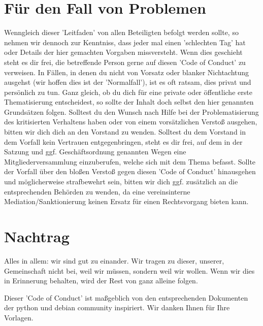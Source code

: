 \documentclass[10pt,a4paper]{article}
\begin{document}
\section*{Für den Fall von Problemen}
Wenngleich dieser 'Leitfaden' von allen Beteiligten befolgt werden sollte, so
nehmen wir dennoch zur Kenntniss, dass jeder mal einen 'schlechten Tag' hat
oder Details der hier gemachten Vorgaben missversteht. Wenn dies geschieht
steht es dir frei, die betreffende Person gerne auf diesen 'Code of Conduct' zu verweisen. In
Fällen, in denen du nicht von Vorsatz oder blanker Nichtachtung ausgehst (wir
hoffen dies ist der 'Normalfall'), ist es oft ratsam, dies privat und persönlich
zu tun. Ganz gleich, ob du dich für eine private oder öffentliche erste
Thematisierung entscheidest, so sollte der Inhalt doch selbst den hier
genannten Grundsätzen folgen.
Solltest du den Wunsch nach Hilfe bei der Problematisierung des kritisierten
Verhaltens haben oder von einem vorsätzlichen Verstoß ausgehen, bitten wir dich
dich an den Vorstand zu wenden. Solltest du dem Vorstand in dem Vorfall kein
Vertrauen entgegenbringen, steht es dir frei, auf dem in der Satzung und ggf.
Geschäftsordnung genannten Wegen eine Mitgliederversammlung einzuberufen,
welche sich mit dem Thema befasst.
Sollte der Vorfall über den bloßen Verstoß gegen diesen 'Code of Conduct'
hinausgehen und möglicherweise strafbewehrt sein, bitten wir dich ggf.
zusätzlich an die entsprechenden Behörden zu wenden, da eine vereinsinterne
Mediation/Sanktionierung keinen Ersatz für einen Rechtsvorgang bieten kann.

\section*{Nachtrag}
Alles in allem: wir sind gut zu einander. Wir tragen zu dieser, unserer,
Gemeinschaft nicht bei, weil wir müssen, sondern weil wir wollen. Wenn wir dies
in Erinnerung behalten, wird der Rest von ganz alleine folgen.

Dieser 'Code of Conduct' ist maßgeblich von den entsprechenden Dokumenten der
python und debian community inspiriert. Wir danken Ihnen für Ihre Vorlagen.
\end{document}
